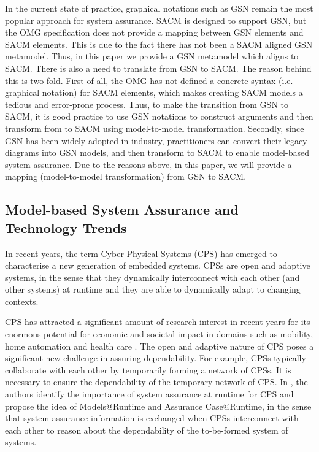 In the current state of practice, graphical notations such as GSN remain the most popular approach for system assurance. 
SACM is designed to support GSN, but the OMG specification does not provide a mapping between GSN elements and SACM elements. 
This is due to the fact there has not been a SACM aligned GSN metamodel. 
Thus, in this paper we provide a GSN metamodel which aligns to SACM. 
There is also a need to translate from GSN to SACM. 
The reason behind this is two fold. First of all, the OMG has not defined a concrete syntax (i.e. graphical notation) for SACM elements, which makes creating SACM models a tedious and error-prone process. 
Thus, to make the transition from GSN to SACM, it is good practice to use GSN notations to construct arguments and then transform from to SACM using model-to-model transformation. Secondly, since GSN has been widely adopted in industry, practitioners can convert their legacy diagrams into GSN models, and then transform to SACM to enable model-based system assurance. 
Due to the reasons above, in this paper, we will provide a mapping (model-to-model transformation) from GSN to SACM.

\subsection{Model-based System Assurance and Technology Trends}

In recent years, the term Cyber-Physical Systems (CPS) has emerged to characterise a new generation of embedded systems. 
CPSs are open and adaptive systems, in the sense that they dynamically interconnect with each other (and other systems) at runtime and they are able to dynamically adapt to changing contexts. 

CPS has attracted a significant amount of research interest in recent years for its enormous potential for economic and societal impact in domains such as mobility, home automation and health care \cite{wei2017deis}. 
The open and adaptive nature of CPS poses a significant new challenge in assuring dependability. 
For example, CPSs typically collaborate with each other by temporarily forming a network of CPSs. 
It is necessary to ensure the dependability of the temporary network of CPS.
In \cite{trapp2013safety}, the authors identify the importance of system assurance at runtime for CPS and propose the idea of Models@Runtime and Assurance Case@Runtime, in the sense that system assurance information is exchanged when CPSs interconnect with each other to reason about the dependability of the to-be-formed system of systems.

